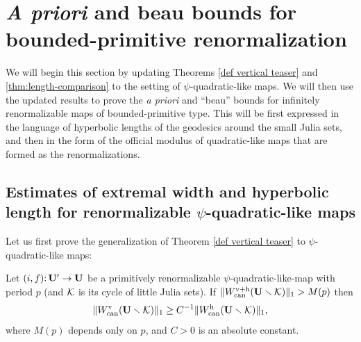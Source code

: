 \renewcommand{\BU}{\mathbf U}
\section{\emph{A priori} and beau bounds for bounded-primitive renormalization} \label{sec:conclusions}
We will begin this section by updating Theorems \ref{def vertical teaser} and \ref{thm:length-comparison} to the setting of $\psi$-quadratic-like maps.
We will then use the updated results to prove the \emph{a priori} and ``beau'' bounds for infinitely renormalizable maps of bounded-primitive type. 
This will be first expressed in the language of hyperbolic lengths of the geodesics around the small Julia sets,
and then in the form of the official modulus of quadratic-like maps that are formed as the renormalizations. 
\subsection{Estimates of extremal width and hyperbolic length for renormalizable $\psi$-quadratic-like maps}
Let us first prove the generalization of Theorem \ref{def vertical teaser} to $\psi$-quadratic-like maps:
\begin{theorem}\label{thm:pseudo-hor-ver}
Let $(i, f)\from \BU'\to \BU$ be a primitively renormalizable $\psi$-quadratic-like-map with period $p$
(and  ${\mathcal K}$ is its cycle of little Julia sets).
If $\| W_\can^{\ver+\hor}(\BU\sm \KK)\|_1 > M(p)$ then
$$
   \|W^\ver_\can(\BU\sm\KK)\|_1 \geq C^{-1} \| W^\hor_\can(\BU\sm \KK)\|_1,
$$
where $M(p)$ depends only on $p$, and $C>0$ is an absolute constant.
\end{theorem}
